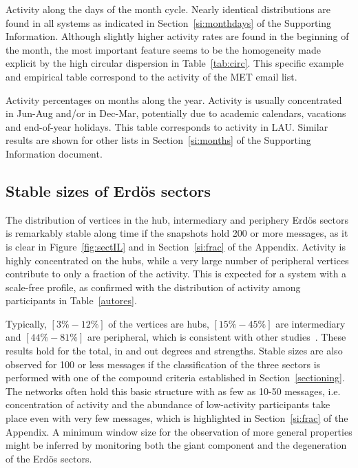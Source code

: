 \FloatBarrier

\begin{table}
\caption{Activity along the days of the month cycle.
Nearly identical distributions are found in all systems
as indicated in Section~\ref*{si:monthdays} of the Supporting Information. Although slightly higher activity rates are found in the beginning of the month, the most important feature seems to be the homogeneity made explicit by the high circular dispersion in Table~\ref{tab:circ}.
This specific example and empirical table correspond to the activity of the MET email list.}
\footnotesize

\label{tab:min}
\end{table}

\begin{table}
\caption{Activity percentages on months along the year. 	Activity is usually concentrated in Jun-Aug and/or in Dec-Mar, potentially due to academic calendars, vacations and end-of-year holidays. This table corresponds to activity in LAU. Similar results are shown for other lists in Section~\ref*{si:months} of the Supporting Information document.}
\footnotesize

\label{tab:min22}
\end{table}


\subsection{Stable sizes of Erd\"os sectors}\label{subsec:pih}

The distribution of vertices in the hub, intermediary and periphery Erd\"os sectors is remarkably stable along time if the snapshots hold 200 or more messages,
as it is clear in Figure~\ref{fig:sectIL} and in Section~\ref{si:frac} of the Appendix. 
Activity is highly concentrated on the hubs, while a very large number of peripheral vertices contribute to only a fraction of the activity.
This is expected for a system with a scale-free profile, as confirmed with the distribution of activity among participants in Table~\ref{autores}.

Typically, $[3\%-12\%]$ of the vertices are hubs,
$[15\%-45\%]$ are intermediary and $[44\%-81\%]$ are peripheral,
which is consistent with other studies~\cite{secFree}.
These results hold for the total, in and out degrees and strengths.
Stable sizes are also observed for 100 or less messages if the classification 
of the three sectors is performed with one of the compound criteria established in Section~\ref{sectioning}. The networks often hold this basic structure with as few as 10-50 messages, i.e. concentration of activity and the abundance of low-activity participants take place even with very few messages, which is highlighted in Section~\ref{si:frac} of the Appendix.
A minimum window size for the observation of more general properties might be inferred by monitoring 
both the giant component and the degeneration of the Erd\"os sectors.

